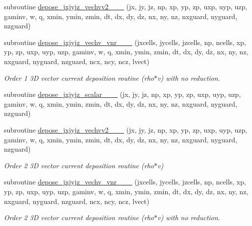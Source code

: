\begin{DoxyCompactItemize}
subroutine \hyperlink{current__deposition_8_f90_a084ed42e79187e34df1e5e49cb589e87}{depose\+\_\+jxjyjz\+\_\+vechvv2\+\_\+\_\+\_} (jx, jy, jz, np, xp, yp, zp, uxp, uyp, uzp, gaminv, w, q, xmin, ymin, zmin,                                       dt, dx, dy, dz, nx, ny, nz, nxguard, nyguard, nzguard)
\item 
subroutine \hyperlink{current__deposition_8_f90_a640df01330ec2f2b5ffcb43938a71db5}{depose\+\_\+jxjyjz\+\_\+vechv\+\_\+vnr\+\_\+\_\+\_} (jxcells, jycells, jzcells, np, ncells, xp, yp, zp,                                   uxp, uyp, uzp, gaminv, w, q, xmin, ymin, zmin,                                       dt, dx, dy, dz, nx, ny, nz, nxguard, nyguard, nzguard, ncx, ncy, ncz, lvect)
\begin{DoxyCompactList}\small\item\em Order 1 3D vector current deposition routine (rho$\ast$v) with no reduction. \end{DoxyCompactList}\item 
subroutine \hyperlink{current__deposition_8_f90_a3b2c43f71118a3d22ad1d1fea9494fa4}{depose\+\_\+jxjyjz\+\_\+scalar\+\_\+\_\+\_} (jx, jy, jz, np, xp, yp, zp, uxp, uyp, uzp, gaminv, w, q, xmin, ymin, zmin,                                       dt, dx, dy, dz, nx, ny, nz, nxguard, nyguard, nzguard)
\item 
subroutine \hyperlink{current__deposition_8_f90_a82878814b59bae3273786c1c0e92deb6}{depose\+\_\+jxjyjz\+\_\+vechvv2\+\_\+\_\+\_} (jx, jy, jz, np, xp, yp, zp, uxp, uyp, uzp, gaminv, w, q, xmin, ymin, zmin,                                       dt, dx, dy, dz, nx, ny, nz, nxguard, nyguard, nzguard)
\begin{DoxyCompactList}\small\item\em Order 2 3D vector current deposition routine (rho$\ast$v) \end{DoxyCompactList}\item 
subroutine \hyperlink{current__deposition_8_f90_a110bf577b181354401374e000770acbf}{depose\+\_\+jxjyjz\+\_\+vechv\+\_\+vnr\+\_\+\_\+\_} (jxcells, jycells, jzcells, np, ncells, xp, yp, zp,                                   uxp, uyp, uzp, gaminv, w, q, xmin, ymin, zmin,                                       dt, dx, dy, dz, nx, ny, nz, nxguard, nyguard, nzguard, ncx, ncy, ncz, lvect)
\begin{DoxyCompactList}\small\item\em Order 2 3D vector current deposition routine (rho$\ast$v) with no reduction. \end{DoxyCompactList}\item 

\end{DoxyCompactItemize}
